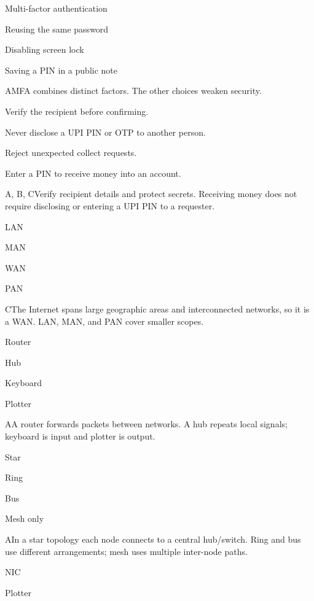 \begin{enumerate}[label=\textbf{Q\arabic*.}, leftmargin=*]
  {\item Multi-factor authentication
   \item Reusing the same password
   \item Disabling screen lock
   \item Saving a PIN in a public note}
  {A}{MFA combines distinct factors. The other choices weaken security.}
  {\item Verify the recipient before confirming.
   \item Never disclose a UPI PIN or OTP to another person.
   \item Reject unexpected collect requests.
   \item Enter a PIN to receive money into an account.}
  {A, B, C}{Verify recipient details and protect secrets. Receiving money does not require disclosing or entering a UPI PIN to a requester.}
\fi
\ifnum{}
  {\item LAN
   \item MAN
   \item WAN
   \item PAN}
  {C}{The Internet spans large geographic areas and interconnected networks, so it is a WAN. LAN, MAN, and PAN cover smaller scopes.}
  {\item Router
   \item Hub
   \item Keyboard
   \item Plotter}
  {A}{A router forwards packets between networks. A hub repeats local signals; keyboard is input and plotter is output.}
  {\item Star
   \item Ring
   \item Bus
   \item Mesh only}
  {A}{In a star topology each node connects to a central hub/switch. Ring and bus use different arrangements; mesh uses multiple inter-node paths.}
  {\item NIC
   \item Plotter
}
\end{enumerate}
